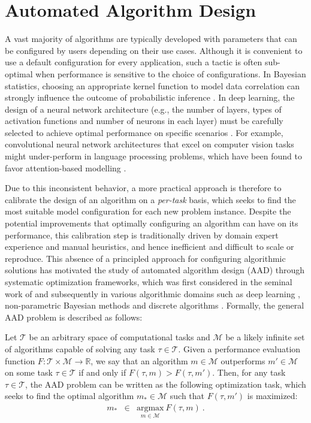 \label{c1:intro}
\section{Automated Algorithm Design}
A vast majority of algorithms are typically developed with parameters that can be configured by users depending on their use cases. Although it is convenient to use a default configuration for every application, such a tactic is often sub-optimal when performance is sensitive to the choice of configurations\cite{balcan2021much,thornton2013auto}. In Bayesian statistics, choosing an appropriate kernel function to model data correlation can strongly influence the outcome of probabilistic inference \cite{Duvenaud13}. In deep learning, the design of a neural network architecture (e.g., the number of layers, types of activation functions and number of neurons in each layer) must be carefully selected to achieve optimal performance on specific scenarios \cite{pham2018,he2020fednas,zoph2016}. For example, convolutional neural network architectures that excel on computer vision tasks \cite{lecun2015lenet,he2016deep} might under-perform in language processing problems, which have been found to favor attention-based modelling \cite{vaswani2017attention}. 

Due to this inconsistent behavior, a more practical approach is therefore to calibrate the design of an algorithm on a \emph{per-task} basis, which seeks to find the most suitable model configuration for each new problem instance. Despite the potential improvements that optimally configuring an algorithm can have on its performance, this calibration step is traditionally driven by domain expert experience and manual heuristics, and hence inefficient and difficult to scale or reproduce. This absence of a principled approach for configuring algorithmic solutions has motivated the study of automated algorithm design (AAD) through systematic optimization frameworks, which was first considered in the seminal work of \citet{rice1976algorithm} and subsequently in various algorithmic domains such as deep learning \cite{pham2018,he2020fednas,Idrissi16}, non-parametric Bayesian methods \cite{Duvenaud13,Malkomes16,Lu18} and discrete algorithms \cite{zheng20miniception,zheng21}. Formally, the general AAD problem is described as follows:

\begin{definition}
Let $\mathcal{T}$ be an arbitrary space of computational tasks and $\mathcal{M}$ be a likely infinite set of algorithms capable of solving any task $\tau \in \mathcal{T}$. Given a performance evaluation function $F: \mathcal{T} \times\mathcal{M} \rightarrow \mathbb{R}$, we say that an algorithm $m \in \mathcal{M}$ outperforms $m' \in \mathcal{M}$ on some task $\tau \in \mathcal{T}$ if and only if $F(\tau, m) > F(\tau, m')$. Then, for any task $\tau \in \mathcal{T}$, the AAD problem can be written as the following optimization task, which seeks to find the optimal algorithm $m_\ast \in \mathcal{M}$ such that $F(\tau, m')$ is maximized:
\begin{eqnarray}
m_\ast &\in& \underset{m \in \mathcal{M}}{\mathrm{argmax}} \ F(\tau, m) \ .
\label{aad-problem}
\end{eqnarray}
\end{definition}
